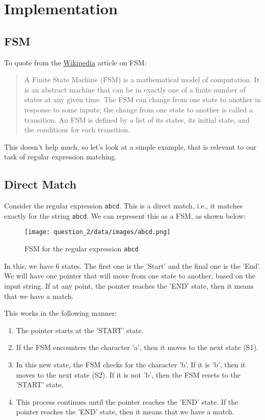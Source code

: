 \documentclass[12pt]{report}
\begin{document}
\section{Implementation}

\subsection{FSM}
To quote from the \href{https://en.wikipedia.org/wiki/Finite-state_machine}{Wikipedia} article on FSM:
\begin{quote}
    A Finite State Machine (FSM) is a mathematical model of computation. It is an abstract machine that can be in exactly one of a finite number of states at any given time. The FSM can change from one state to another in response to some inputs; the change from one state to another is called a transition. An FSM is defined by a list of its states, its initial state, and the conditions for each transition.
\end{quote}

This doesn't help much, so let's look at a simple example, that is relevant to our task of regular expression matching.

\subsection{Direct Match}
Consider the regular expression \texttt{abcd}. This is a direct match, i.e., it matches exactly for the string \texttt{abcd}. We can represent this as a FSM, as shown below:

\begin{figure}[H]
    \centering
    \texttt{[image: question\_2/data/images/abcd.png]}
    \caption{FSM for the regular expression \texttt{abcd}}
\end{figure}

In this, we have 6 states. The first one is the 'Start' and the final one is the 'End'. We will have one pointer that will move from one state to another, based on the input string. If at any point, the pointer reaches the 'END' state, then it means that we have a match.

This works in the following manner:
\begin{enumerate}
    \item The pointer starts at the 'START' state.
    \item If the FSM encounters the character 'a', then it moves to the next state (S1).
    \item In this new state, the FSM checks for the character 'b'. If it is 'b', then it moves to the next state (S2). If it is not 'b', then the FSM resets to the 'START' state.
    \item This process continues until the pointer reaches the 'END' state. If the pointer reaches the 'END' state, then it means that we have a match.
\end{enumerate}
\end{document}
